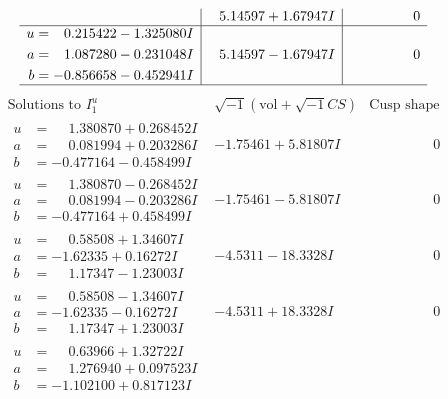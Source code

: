 \documentclass[1p]{elsarticle_modified}
\theoremstyle{definition}
\newcommand{\I}{\sqrt{-1}}
\begin{document}
$$\begin{array}{c|c|c}
 & \phantom{-}5.14597 + 1.67947 I & \phantom{-0.000000 } 0 \\ \hline\begin{aligned}
u &= \phantom{-}0.215422 - 1.325080 I \\
a &= \phantom{-}1.087280 - 0.231048 I \\
b &= -0.856658 - 0.452941 I\end{aligned}
 & \phantom{-}5.14597 - 1.67947 I & \phantom{-0.000000 } 0\\
 \hline 
 \end{array}$$\newpage$$\begin{array}{c|c|c}  
\text{Solutions to }I^u_{1}& \I (\text{vol} + \sqrt{-1}CS) & \text{Cusp shape}\\
 \hline 
\begin{aligned}
u &= \phantom{-}1.380870 + 0.268452 I \\
a &= \phantom{-}0.081994 + 0.203286 I \\
b &= -0.477164 - 0.458499 I\end{aligned}
 & -1.75461 + 5.81807 I & \phantom{-0.000000 } 0 \\ \hline\begin{aligned}
u &= \phantom{-}1.380870 - 0.268452 I \\
a &= \phantom{-}0.081994 - 0.203286 I \\
b &= -0.477164 + 0.458499 I\end{aligned}
 & -1.75461 - 5.81807 I & \phantom{-0.000000 } 0 \\ \hline\begin{aligned}
u &= \phantom{-}0.58508 + 1.34607 I \\
a &= -1.62335 + 0.16272 I \\
b &= \phantom{-}1.17347 - 1.23003 I\end{aligned}
 & -4.5311 - 18.3328 I & \phantom{-0.000000 } 0 \\ \hline\begin{aligned}
u &= \phantom{-}0.58508 - 1.34607 I \\
a &= -1.62335 - 0.16272 I \\
b &= \phantom{-}1.17347 + 1.23003 I\end{aligned}
 & -4.5311 + 18.3328 I & \phantom{-0.000000 } 0 \\ \hline\begin{aligned}
u &= \phantom{-}0.63966 + 1.32722 I \\
a &= \phantom{-}1.276940 + 0.097523 I \\
b &= -1.102100 + 0.817123 I\end{aligned}

\end{array}$$
\end{document}
